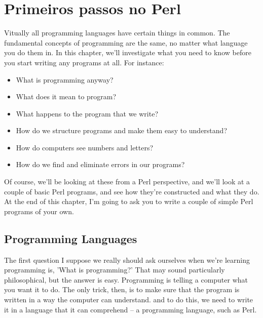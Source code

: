 \documentclass[a4paper,11pt]{book}
\begin{document}

\chapter{Primeiros passos no Perl}

\noindent Vitually all programming languages have certain things in common. The fundamental concepts of programming are the same, no matter what language you do them in. In this chapter, we'll investigate what you need to know before you start writing any programs at all. For instance:

\begin{itemize}

 \item What is programming anyway? 

 \item What does it mean to program?

 \item What happens to the program that we write?

 \item How do we structure programs and make them easy to understand?

 \item How do computers see numbers and letters?

 \item How do we find and eliminate errors in our programs?

\end{itemize}

\noindent Of course, we'll be looking at these from a Perl perspective, and we'll look at a couple of basic Perl programs, and see how they're constructed and what they do. At the end of this chapter, I'm going to ask you to write a couple of simple Perl programs of your own.

\noindent 

\noindent 

\section{Programming Languages}

\noindent 

\noindent The first question I suppose we really should ask ourselves when we're learning programming is, 'What is programming?' That may sound particularly philosophical, but the answer is easy. Programming is telling a computer what you want it to do. The only trick, then, is to make sure that the program is written in a way the computer can understand. and to do this, we need to write it in a language that it can comprehend -- a programming language, such as Perl.
\end{document}
